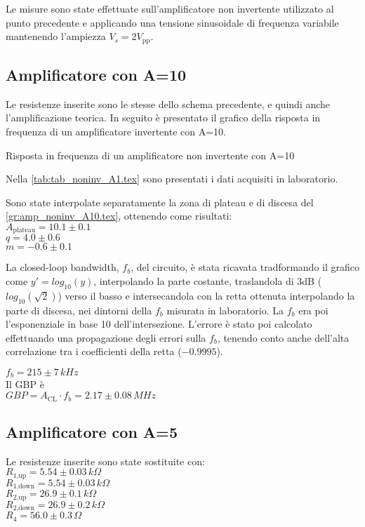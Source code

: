 Le misure sono state effettuate sull'amplificatore non invertente utilizzato al punto precedente e applicando una tensione sinusoidale 
di frequenza variabile mantenendo l'ampiezza $V_s= 2 V_\textrm{pp}$.

\subsection{Amplificatore con A=10}
Le resistenze inserite sono le stesse dello schema precedente, e quindi anche l'amplificazione teorica.
In seguito è presentato il grafico della risposta in frequenza di un amplificatore invertente con A=10.
\begin{grafico}
 \centering 
  \resizebox{\textwidth}{!}{%
 
 }%
 \caption{Risposta in frequenza di un amplificatore non invertente con A=10} 
 \label{gr:amp_noninv_A10.tex} 
\end{grafico}
Nella \autoref{tab:tab_noninv_A1.tex} sono presentati i dati acquisiti in laboratorio.
%   

Sono state interpolate separatamente la zona di plateau e di discesa del \autoref{gr:amp_noninv_A10.tex}, ottenendo come risultati:\\
$A_\textrm{plateau}=10.1 \pm 0.1 $\\
$q = 4.0 \pm 0.6$\\
$m = -0.6 \pm 0.1$

La closed-loop bandwidth, $f_b$, del circuito, è stata ricavata tradformando il grafico come $y'=log_\textrm{10}(y)$, interpolando la parte costante, 
traslandola di 3dB ($log_\textrm{10}(\sqrt{2})$) verso il basso e intersecandola con la retta ottenuta interpolando la parte di discesa, nei dintorni della $f_b$ misurata in laboratorio. La $f_b$ era poi l'esponenziale in base 10 dell'intersezione.
L'errore è stato poi calcolato effettuando una propagazione degli errori sulla $f_b$, tenendo conto anche dell'alta correlazione tra i coefficienti della retta ($-0.9995$).

\noindent
$f_b= 215 \pm 7 \,kHz $\\
Il GBP è\\
$GBP=A_\textrm{CL} \cdot f_b = 2.17 \pm 0.08 \,MHz$\\


\subsection{Amplificatore con A=5}
Le resistenze inserite sono state sostituite con:\\
$R_\textrm{1,up}=5.54 \pm 0.03\,k\Omega $\\ %
$R_\textrm{1,down}=5.54 \pm 0.03\,k\Omega$\\ %
$R_\textrm{2,up}=26.9 \pm 0.1\,k\Omega$\\ %
$R_\textrm{2,down}=26.9 \pm 0.2 \,k\Omega$\\
$R_4=56.0 \pm 0.3\,\Omega$

